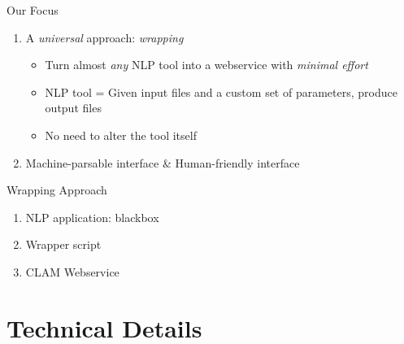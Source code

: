 \documentclass[compress]{beamer}
\begin{document}
\begin{frame}
    \begin{block}{Our Focus}
   
        \begin{enumerate}
            \item A \emph{universal} approach: \emph{wrapping}
            \begin{itemize}
                \item Turn almost \emph{any} NLP tool into a webservice with \emph{minimal effort}
                \item NLP tool = Given input files and a custom set of parameters, produce output files
                \item No need to alter the tool itself
            \end{itemize}
            \item Machine-parsable interface \& Human-friendly interface
        \end{enumerate}
    
    \end{block}
\end{frame}




\begin{frame}

    \begin{block}{Wrapping Approach}

       
        \begin{enumerate}
            \item NLP application: blackbox
            \item Wrapper script
            \item CLAM Webservice
        \end{enumerate}

    \end{block}


\end{frame}


\section{Technical Details}
\end{document}
